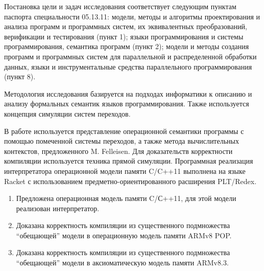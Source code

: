 Постановка цели и задач исследования соответствует следующим пунктам паспорта специальности 05.13.11:
модели, методы и алгоритмы проектирования и анализа программ и программных систем, их эквивалентных преобразований, верификации и тестирования (пункт 1);
языки программирования и системы программирования, семантика программ (пункт 2);
модели и методы создания программ и программных систем для параллельной и распределенной обработки данных,
языки и инструментальные средства параллельного программирования (пункт 8).

{\methods}
Методология исследования базируется на подходах информатики
к описанию и анализу формальных семантик языков программирования.
Также используется концепция симуляции систем переходов.

В работе используется представление операционной семантики программы с помощью помеченной системы переходов,
а также метода вычислительных контекстов, предложенного M. Felleisen.
Для доказательств корректности компиляции используется техника прямой симуляции.
Программная реализация интерпретатора операционной модели памяти C/C++11 выполнена на языке Racket 
с использованием предметно-ориентированного расширения PLT/Redex.

{}
\begin{enumerate}
  \item Предложена операционная модель памяти C/С++11, для этой модели реализован интерпретатор.
  \item Доказана корректность компиляции из существенного подмножества ``обещающей'' \; модели в операционную модель памяти ARMv8 POP.
  \item Доказана корректность компиляции из существенного подмножества ``обещающей'' \; модели в аксиоматическую модель памяти ARMv8.3.
\end{enumerate}

